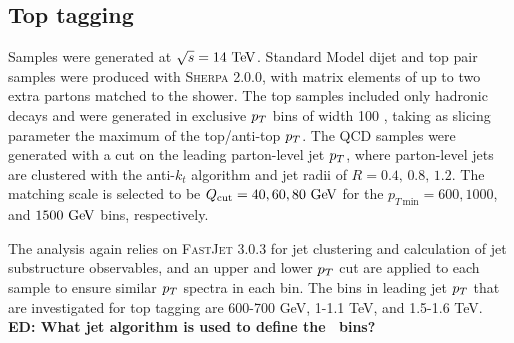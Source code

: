 \subsection{Top tagging}
Samples were generated at $\sqrt{s}=14\TeV$. Standard Model dijet and top pair
samples were produced with \textsc{Sherpa} 2.0.0, with matrix elements of up
to two extra partons matched to the shower. The top samples included only
hadronic decays and  were generated in exclusive $p_T$ bins of width 100 \GeV,
taking as slicing parameter the maximum of the top/anti-top $p_T$. The QCD
samples were generated with a cut on the leading parton-level jet $p_T$, where
parton-level jets are clustered with the anti-$k_t$ algorithm and jet radii of
$R= 0.4,\,0.8,\,1.2$. The matching scale is selected to be $Q_{\rm cut}=40, 60, 80 \GeV$ for
the $p_{T\,\text{min}}=600, 1000$, and $1500 \GeV$ bins, respectively.
 
The analysis again relies on \textsc{FastJet} 3.0.3 for jet clustering and
calculation of jet substructure observables, and an upper and lower $p_T$ cut are applied
to each sample to ensure similar $p_T$ spectra in each bin. The bins in leading jet $p_T$
that are investigated for top tagging are 600-700 GeV, 1-1.1 TeV, and
1.5-1.6 TeV. {\bf ED: What jet algorithm is used to define the \pt~bins?}